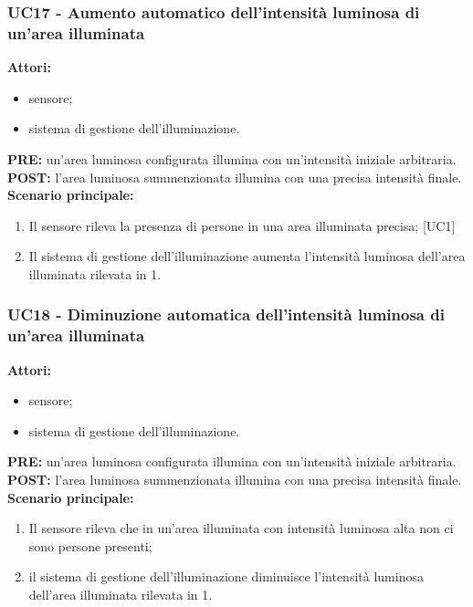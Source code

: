 \documentclass[a4paper, 12pt]{article}
\begin{document}
\subsubsection{UC17 - Aumento automatico dell'intensità luminosa di un'area illuminata}
\textbf{Attori:}
\begin{itemize}
    \item sensore;
    \item sistema di gestione dell'illuminazione.
\end{itemize}
\textbf{PRE:} un'area luminosa configurata illumina con un'intensità iniziale arbitraria.\newline
\textbf{POST:} l'area luminosa summenzionata illumina con una precisa intensità finale.\newline
\textbf{Scenario principale:}
\begin{enumerate}
    \item Il sensore rileva la presenza di persone in una area illuminata precisa; [UC1]
    \item Il sistema di gestione dell'illuminazione aumenta l'intensità luminosa dell'area illuminata rilevata in 1.
\end{enumerate}

\subsubsection{UC18 - Diminuzione automatica dell'intensità luminosa di un'area illuminata}
\textbf{Attori:}
\begin{itemize}
    \item sensore;
    \item sistema di gestione dell'illuminazione.
\end{itemize}
\textbf{PRE:} un'area luminosa configurata illumina con un'intensità iniziale arbitraria.\newline
\textbf{POST:} l'area luminosa summenzionata illumina con una precisa intensità finale.\newline
\textbf{Scenario principale:}
\begin{enumerate}
    \item Il sensore rileva che in un'area illuminata con intensità luminosa alta non ci sono persone presenti;
    \item il sistema di gestione dell'illuminazione diminuisce l'intensità luminosa dell'area illuminata rilevata in 1.
\end{enumerate}
\end{document}

